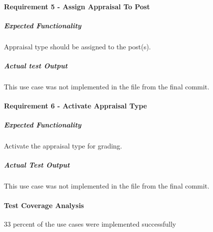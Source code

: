 \paragraph{Requirement 5 - Assign Appraisal To Post}
	\subparagraph{Expected Functionality}
	Appraisal type should be assigned to the post(s).
	\subparagraph{Actual test Output}
	This use case was not implemented in the file from the final commit.
	
\paragraph{Requirement 6 - Activate Appraisal Type}
	\subparagraph{Expected Functionality}
	Activate the appraisal type for grading.
	\subparagraph{Actual Test Output}	
	This use case was not implemented in the file from the final commit.

	\paragraph{Test Coverage Analysis}
	33 percent of the use cases were implemented successfully


	
